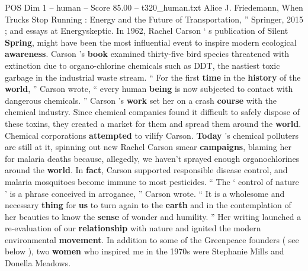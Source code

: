 \begin{textsample}{POS Dim 1 – human – Score 85.00 – t320\_human.txt}
Alice J.
Friedemann, When Trucks Stop Running : Energy and the Future of Transportation, ” Springer, 2015 ; and essays at Energyskeptic.
In 1962, Rachel Carson ‘ s publication of Silent \textbf{Spring}, might have been the most influential event to inspire modern ecological \textbf{awareness}.
Carson ’s \textbf{book} examined thirty-five bird species threatened with extinction due to organo-chlorine chemicals such as DDT, the nastiest toxic garbage in the industrial waste stream. “ For the first \textbf{time} in the \textbf{history} of the \textbf{world}, ” Carson wrote, “ every human \textbf{being} is now subjected to contact with dangerous chemicals. ” Carson ’s \textbf{work} set her on a crash \textbf{course} with the chemical industry.
Since chemical companies found it difficult to safely dispose of these toxins, they created a market for them and spread them around the \textbf{world}.
Chemical corporations \textbf{attempted} to vilify Carson. \textbf{Today} ’s chemical polluters are still at it, spinning out new Rachel Carson smear \textbf{campaigns}, blaming her for malaria deaths because, allegedly, we haven't sprayed enough organochlorines around the \textbf{world}.
In \textbf{fact}, Carson supported responsible disease control, and malaria mosquitoes become immune to most pesticides. “ The ‘ control of nature ’ is a phrase conceived in arrogance, ” Carson wrote. “ It is a wholesome and necessary \textbf{thing} for \textbf{us} to turn again to the \textbf{earth} and in the contemplation of her beauties to know the \textbf{sense} of wonder and humility. ” Her writing launched a re-evaluation of our \textbf{relationship} with nature and ignited the modern environmental \textbf{movement}.
In addition to some of the Greenpeace founders ( see below ), two \textbf{women} who inspired me in the 1970s were Stephanie Mills and Donella Meadows.

\end{textsample}

